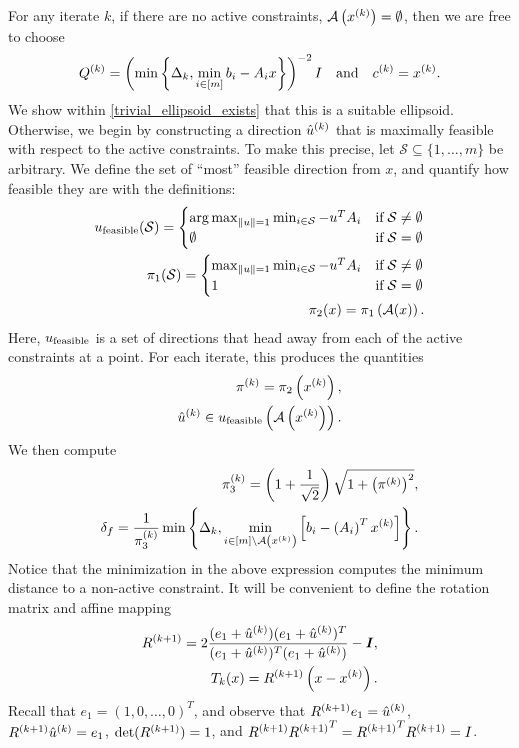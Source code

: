 \documentclass{article}
\begin{document}
For any iterate $k$, if there are no active constraints, ${\mathcal A}\left(x^{(k)}\right) = \emptyset$, then we are free to choose
\begin{align}
\label{define_linear_trivial_ellipse}
{Q^{(k)}} = \left(\min\left\{\Delta_k, \min_{i \in [m]}{b_i - A_i x}\right\} \right)^{-2}I\quad \textrm{and} \quad c^{(k)} = x^{(k)}.
\end{align}
We show within \cref{trivial_ellipsoid_exists} that this is a suitable ellipsoid.
Otherwise, we begin by constructing a direction ${{{\hat u}^{(k)}}}$ that is maximally feasible with respect to the active constraints.
To make this precise, let $\mathcal S \subseteq \{1, \ldots, m\}$ be arbitrary.
We define the set of ``most'' feasible direction from $x$, and quantify how feasible they are with the definitions:
\begin{align}
{u_{\textrm{feasible}}} (\mathcal S) = \begin{cases}
\operatorname*{arg\,max}_{\|u\| = 1} \min_{i \in \mathcal S} -u^T{{A}}_i & \text{if} \; \mathcal S \ne \emptyset \\
\emptyset & \text{if} \; \mathcal S = \emptyset
\end{cases} \label{define_alpha_one} \\
{\pi_1}(\mathcal S) = \begin{cases}
\max_{\|u\| = 1} \min_{i \in \mathcal S} -u^T{{A}}_i & \text{if} \; \mathcal S \ne \emptyset \\
1 & \text{if} \; \mathcal S = \emptyset
\end{cases} \label{define_alpha_two} \\
\pi_2(x) = {\pi_1}\left({\mathcal A}(x)\right). \label{define_alpha_three}
\end{align}
Here, ${u_{\textrm{feasible}}}$ is a set of directions that head away from each of the active constraints at a point.
For each iterate, this produces the quantities
\begin{align}
\pi^{(k)} =  \pi_2\left(x^{(k)}\right) \label{define_alpha_k}, \\
{{{\hat u}^{(k)}}} \in  {u_{\textrm{feasible}}}\left({\mathcal A}\left(x^{(k)}\right)\right). \label{define_u_k}
\end{align}
We then compute
\begin{align}
\pi_3^{(k)}=\left(1+\frac{1}{\sqrt{2}}\right)\sqrt{1+\left(\pi^{(k)}\right)^2}, \label{define_alphakp} \\
\delta_{f} = \frac 1 {\pi_3^{(k)}} \min\left\{\Delta_k, \min_{i \in [m] \setminus {\mathcal A}\left(x^{(k)}\right)} \left[{{b}}_i - \left({{A}}_i\right)^Tx^{(k)}\right]\right\}. \label{define_deltaf}
\end{align}
Notice that the minimization in the above expression computes the minimum distance to a non-active constraint.
It will be convenient to define the rotation matrix and affine mapping
\begin{align}
{R^{(k+1)}} = 2\frac{(e_1 + {{{\hat u}^{(k)}}})(e_1 +{{{\hat u}^{(k)}}})^T}{(e_1 +{{{\hat u}^{(k)}}})^T(e_1 +{{{\hat u}^{(k)}}})} - \boldsymbol I, \label{define_r} \\
T_k(x) = {R^{(k+1)}}\left(x - x^{(k)}\right). \label{define_affine_mapping}
\end{align}
Recall that $e_1 = (1, 0, \ldots, 0)^T$, and observe that ${R^{(k+1)}} e_1 = {{{\hat u}^{(k)}}}$, ${R^{(k+1)}} {{{\hat u}^{(k)}}} = e_1$, $\det({R^{(k+1)}}) = 1$, and 
${R^{(k+1)}} {R^{(k+1)}} ^T = {R^{(k+1)}} ^T{R^{(k+1)}} = I$.
\end{document}
